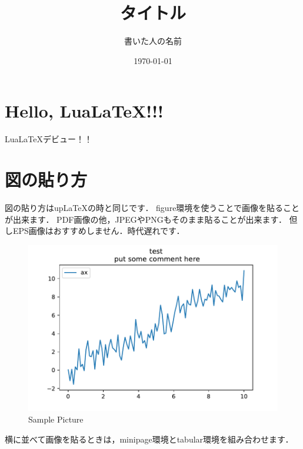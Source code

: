 \documentclass[a4paper, 11pt, lualatex, ja=standard]{bxjsarticle}
\title{\Huge タイトル}
\author{\huge 書いた人の名前}
\date{\today}
\begin{document}
  \maketitle

  \section{Hello, Lua\LaTeX !!!}
    Lua\LaTeX デビュー！！
  
  \section{図の貼り方}
    図の貼り方はup\LaTeX の時と同じです．
    figure環境を使うことで画像を貼ることが出来ます．
    PDF画像の他，JPEGやPNGもそのまま貼ることが出来ます．
    但しEPS画像はおすすめしません．時代遅れです．

    \begin{figure}[h]
      \centering
      \includegraphics[width=120truemm, clip]{images/graph_sample.pdf}
      \caption{Sample Picture}
      \label{fig:sample}
    \end{figure}

    横に並べて画像を貼るときは，minipage環境とtabular環境を組み合わせます．
\end{document}
